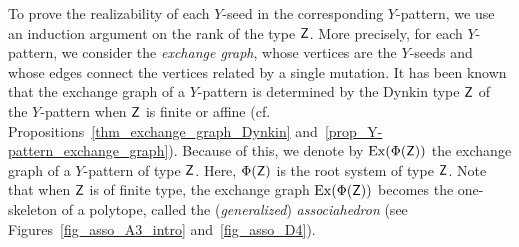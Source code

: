 To prove the realizability of each $Y$-seed in the corresponding $Y$-pattern, we use an induction argument on the rank of the type $\mathsf{Z}$. 
More precisely, for each $Y$-pattern, we consider the \emph{exchange graph}, whose vertices are the $Y$-seeds and whose edges connect the vertices related by a single mutation. 
It has been known that the exchange graph of a $Y$-pattern is determined by the Dynkin type $\mathsf{Z}$ of the $Y$-pattern when $\mathsf{Z}$ is finite or affine (cf. Propositions~\ref{thm_exchange_graph_Dynkin} and~\ref{prop_Y-pattern_exchange_graph}). Because of this, we denote by $\operatorname{Ex}(\Phi(\mathsf{Z}))$ the exchange graph of a $Y$-pattern of type $\mathsf{Z}$.
Here, $\Phi(\mathsf{Z})$ is the root system of type $\mathsf{Z}$. Note that when $\mathsf{Z}$ is of finite type, the exchange graph $\operatorname{Ex}(\Phi(\mathsf{Z}))$ becomes the one-skeleton of a polytope, called the (\emph{generalized}) \emph{associahedron} (see Figures~\ref{fig_asso_A3_intro} and~\ref{fig_asso_D4}).
